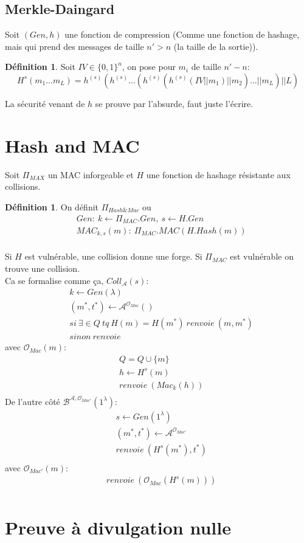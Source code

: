 \documentclass[12pt]{article}
\theoremstyle{plain}
\theoremstyle{definition}
\newtheorem{defn}[subsubsection]{D\'efinition}
\theoremstyle{remark}
\newcommand{\A}{\mathcal{A}}
\newcommand{\Or}{\mathcal{O}}
\begin{document}
\subsection{Merkle-Daingard}
Soit $(Gen, h)$ une fonction de compression (Comme une 
fonction de hashage, mais qui prend des messages 
de taille $n' > n$ (la taille de la sortie)).\\
\begin{defn}
    Soit $IV\in\{0,1\}^n$, on pose pour $m_i$ de taille 
    $n'-n$: \[H^s(m_1\ldots m_L)
    =h^{(s)}(h^{(s)}\ldots (h^{(s)}(h^{(s)}(IV||m_1)||m_2)\ldots||m_L)|| L)\]
\end{defn}

La sécurité venant de $h$ se prouve par l'absurde, faut juste 
l'écrire.

\section{Hash and MAC}
Soit $\Pi_{MAX}$ un MAC inforgeable et $H$ une fonction 
de hashage résistante aux collisions.
\begin{defn}
    On définit $\Pi_{Hash\&Mac}$ ou 
    \begin{align*}
        &Gen:~k\leftarrow \Pi_{MAC}.Gen,~s\leftarrow H.Gen\\
        &MAC_{k,s}(m):~\Pi_{MAC}.MAC(H.Hash(m))\\
    \end{align*}
\end{defn}
Si $H$ est vulnérable, une collision donne une forge.
Si $\Pi_{MAC}$ est vulnérable on trouve une collision.\\
\indent Ca se formalise comme ça, $Coll_{\A}(s):$
\begin{align*}
    &k\leftarrow Gen(\lambda)\\    
    &(m^*,t^*)\leftarrow \A^{\Or_{Mac}}()\\
    &si~\exists\in Q~tq~H(m)=H(m^*)~renvoie~(m,m^*)\\
    &sinon~renvoie~
\end{align*}
avec $\Or_{Mac}(m):$
\begin{align*}
    &Q=Q\cup\{m\}\\
    &h\leftarrow H^s(m)\\
    &renvoie~(Mac_k(h))\\
\end{align*}
De l'autre côté $\mathcal{B}^{\A,\Or_{Mac'}}(1^{\lambda}):$
\begin{align*}
    &s\leftarrow Gen(1^{\lambda})\\
    &(m^*,t^*)\leftarrow \A^{\Or_{Mac'}}\\
    &renvoie~(H^s(m^*),t^*)\\
\end{align*}
avec $\Or_{Mac'}(m):$
\begin{align*}
    &renvoie~(\Or_{Mac}(H^s(m)))\\
\end{align*}


\section{Preuve à divulgation nulle}
\end{document}
